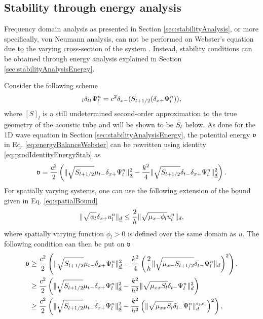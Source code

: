 {\subsection{Stability through energy analysis}\label{sec:stabilityEnergyWebster}
Frequency domain analysis as presented in Section \ref{sec:stabilityAnalysis}, or more specifically, von Neumann analysis, can not be performed on Webster's equation due to the varying cross-section of the system \cite{theBible}. Instead, stability conditions can be obtained through energy analysis explained in Section \ref{sec:stabilityAnalysisEnergy}.

Consider the following scheme
\begin{equation}
    [S]_l \delta_{tt}\Psi^n_l = c^2\dxm(\Sp(\delta_{x+}\Psiln)),
\end{equation}
where $[S]_l$ is a still undetermined second-order approximation to the true geometry of the acoustic tube and will be shown to be $\bar{S}_l$ below. As done for the 1D wave equation in Section \ref{sec:stabilityAnalysisEnergy}, the potential energy $\mathfrak{v}$ in Eq. \eqref{eq:energyBalanceWebster} can be rewritten using identity \eqref{eq:prodIdentityEnergyStab} as
\begin{equation*}
    \mathfrak{v} = \frac{c^2}{2}\left(\lVert\sqrt{S_{l+1/2}}\mu_{t-}\delta_{x+}\Psi_l^n\rVert_{\underline{d}}^2-\frac{k^2}{4}\lVert\sqrt{S_{l+1/2}}\delta_{t-}\delta_{x+} \Psi_l^n\rVert_{\underline{d}}^2\right).
\end{equation*}
For spatially varying systems, one can use the following extension of the bound given in Eq. \eqref{eq:spatialBound} \cite{theBible}
\begin{equation}\label{eq:spatialBoundWebster}
    \lVert \sqrt{\phi_l}\delta_{x+} u_l^n \rVert_{\underline{d}} \leq\frac{2}{h}\lVert \sqrt{\mu_{x-}\phi_l} u_l^n \rVert_d,
\end{equation}
where spatially varying function $\phi_l > 0$ is defined over the same domain as $u$. The following condition can then be put on $\mathfrak{v}$
\begin{align*}
    \v &\geq \frac{c^2}{2}\left(\lVert\sqrt{S_{l+1/2}}\mtm\dxp\Psiln\rVert_{\underline{d}}^2 - \frac{k^2}{4}\left(\frac{2}{h}\lVert\sqrt{\mxm \Sp}\dtm\Psiln\rVert_{d}\right)^2\right),\\
    &\geq \frac{c^2}{2}\left(\lVert\sqrt{S_{l+1/2}}\mtm\dxp\Psiln\rVert_{\underline{d}}^2 - \frac{k^2}{h^2}\lVert\sqrt{\mxx S_l}\dtm\Psiln\rVert_{d}^2\right)\\
    & \geq \frac{c^2}{2}\left(\lVert\sqrt{S_{l+1/2}}\mtm\dxp\Psiln\rVert_{\underline{d}}^2 - \frac{k^2}{h^2}\left(\lVert\sqrt{\mxx S_l}\dtm\Psiln\rVert_{d}^{\el,\er}\right)^2\right),

\end{align*}}

